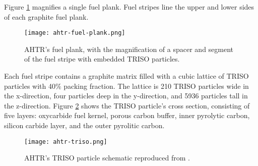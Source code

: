 Figure \ref{fig:ahtr-fuel-plank} magnifies a single fuel plank. 
Fuel stripes line the upper and lower sides of each graphite fuel plank. 
\begin{figure}[htbp]
    \centering
    \texttt{[image: ahtr-fuel-plank.png]} 
            \hspace{0.5cm}
    \caption{\acrfull{AHTR}'s fuel plank, with the magnification of 
    a spacer and segment of the fuel stripe with embedded \gls{TRISO} particles.}
    \label{fig:ahtr-fuel-plank}
\end{figure}
Each fuel stripe contains a graphite matrix filled with a cubic lattice of 
\gls{TRISO} particles with 40\% packing fraction. 
The lattice is 210 \gls{TRISO} particles wide in the x-direction, four particles 
deep in the y-direction, and 5936 particles tall in the z-direction. 
Figure \ref{fig:ahtr-triso} shows the \gls{TRISO} particle's cross section, 
consisting of five layers: oxycarbide fuel kernel, porous carbon buffer, 
inner pyrolytic carbon, silicon carbide layer, and the outer pyrolitic carbon. 
\begin{figure}[htbp]
    \centering
    \texttt{[image: ahtr-triso.png]} 
    \caption{\acrlong{AHTR}'s TRISO particle schematic reproduced from 
    \cite{petrovic_benchmark_2021}.}
    \label{fig:ahtr-triso}
\end{figure}

